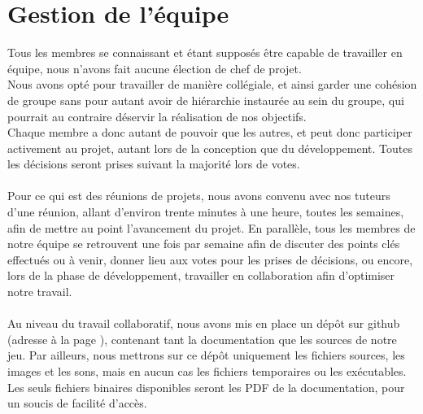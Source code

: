 \documentclass[a4paper]{memoir}
\begin{document}
		\section{Gestion de l'équipe}
			Tous les membres se connaissant et étant supposés être capable de travailler en équipe, nous n'avons fait aucune élection de chef de projet.\\
			Nous avons opté pour travailler de manière collégiale, et ainsi garder une cohésion de groupe sans pour autant avoir de hiérarchie instaurée au sein du groupe, qui pourrait au contraire déservir la réalisation de nos objectifs.\\
			Chaque membre a donc autant de pouvoir que les autres, et peut donc participer activement au projet, autant lors de la conception que du développement. Toutes les décisions seront prises suivant la majorité lors de votes.\\\\
			Pour ce qui est des réunions de projets, nous avons convenu avec nos tuteurs d'une réunion, allant d'environ trente minutes à une heure, toutes les semaines, afin de mettre au point l'avancement du projet. En parallèle, tous les membres de notre équipe se retrouvent une fois par semaine afin de discuter des points clés effectués ou à venir, donner lieu aux votes pour les prises de décisions, ou encore, lors de la phase de développement, travailler en collaboration afin d'optimiser notre travail.\\\\
			Au niveau du travail collaboratif, nous avons mis en place un dépôt sur github (adresse à la page \pageref{url:github}), contenant tant la documentation que les sources de notre jeu. Par ailleurs, nous mettrons sur ce dépôt uniquement les fichiers sources, les images et les sons, mais en aucun cas les fichiers temporaires ou les exécutables. Les seuls fichiers binaires disponibles seront les PDF de la documentation, pour un soucis de facilité d'accès.
\end{document}
